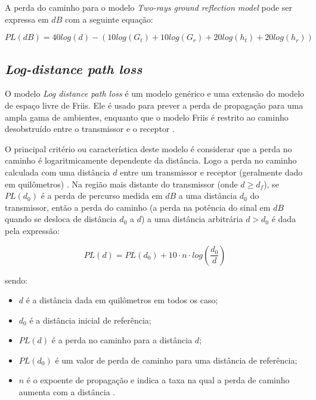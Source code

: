 \documentclass[
	12pt,				%
	twoside,			%
	a4paper,			%
	english,			%
	french,				%
	spanish,			%
	brazil				%
	]{abntex2}
\begin{document}
A perda do caminho para o modelo \emph{Two-rays ground reflection model}
pode ser expressa em \(dB\) com a seguinte equação:

\begin{equation}
PL(dB) = 40 log (d) -(10 log (G_{t}) + 10 log (G_{r}) + 20 log (h_{t}) + 20 log (h_{r}))
\end{equation}

\subsection{\texorpdfstring{\emph{Log-distance path
loss}}{Log-distance path loss}}\label{sec:log_distance}

O modelo \emph{Log distance path loss} é um modelo genérico e uma
extensão do modelo de espaço livre de Friis. Ele é usado para prever a
perda de propagação para uma ampla gama de ambientes, enquanto que o
modelo Friis é restrito ao caminho desobstruído entre o transmissor e o
receptor \cite{LUO}.

O principal critério ou característica deste modelo é considerar que a
perda no caminho é logaritmicamente dependente da distância. Logo a
perda no caminho calculada com uma distância \(d\) entre um transmissor
e receptor (geralmente dado em quilômetros) . Na região mais distante do
transmissor (onde \(d \geq d_{f}\)), se \(PL(d_{0})\) é a perda de
percurso medida em \(dB\) a uma distância \(d_{0}\) do transmissor,
então a perda do caminho (a perda na potência do sinal em \(dB\) quando
se desloca de distância \(d_{0}\) a \(d\)) a uma distância arbitrária
\(d > d_{0}\) é dada pela expressão:

\begin{equation}
PL(d) = PL(d_{0}) + 10 \cdot n \cdot log(\frac{d_{0}}{d})
\end{equation}

sendo:

\begin{itemize}
\item
  \(d\) é a distância dada em quilômetros em todos os caso;
\item
  \(d_{0}\) é a distância inicial de referência;
\item
  \(PL(d)\) é a perda no caminho para a distância \(d\);
\item
  \(PL(d_{0})\) é um valor de perda de caminho para uma distância de
  referência;
\item
  \(n\) é o expoente de propagação e indica a taxa na qual a perda de
  caminho aumenta com a distância \cite{MATHURANATHAN}.
\end{itemize}
\end{document}

